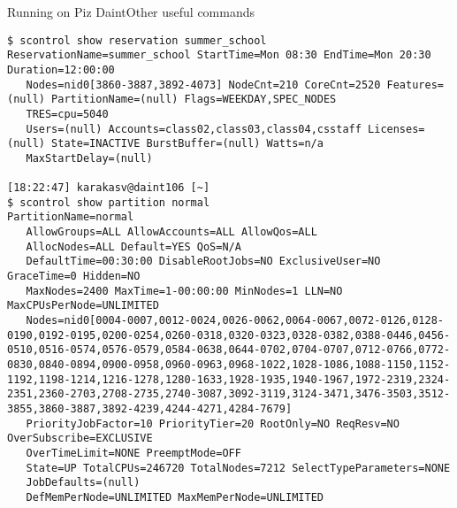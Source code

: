 \begin{frame}[fragile]{Running on Piz Daint}{Other useful commands}
  \begin{lstlisting}[style=console]
$ scontrol show reservation summer_school
ReservationName=summer_school StartTime=Mon 08:30 EndTime=Mon 20:30 Duration=12:00:00
   Nodes=nid0[3860-3887,3892-4073] NodeCnt=210 CoreCnt=2520 Features=(null) PartitionName=(null) Flags=WEEKDAY,SPEC_NODES
   TRES=cpu=5040
   Users=(null) Accounts=class02,class03,class04,csstaff Licenses=(null) State=INACTIVE BurstBuffer=(null) Watts=n/a
   MaxStartDelay=(null)

[18:22:47] karakasv@daint106 [~]
$ scontrol show partition normal
PartitionName=normal
   AllowGroups=ALL AllowAccounts=ALL AllowQos=ALL
   AllocNodes=ALL Default=YES QoS=N/A
   DefaultTime=00:30:00 DisableRootJobs=NO ExclusiveUser=NO GraceTime=0 Hidden=NO
   MaxNodes=2400 MaxTime=1-00:00:00 MinNodes=1 LLN=NO MaxCPUsPerNode=UNLIMITED
   Nodes=nid0[0004-0007,0012-0024,0026-0062,0064-0067,0072-0126,0128-0190,0192-0195,0200-0254,0260-0318,0320-0323,0328-0382,0388-0446,0456-0510,0516-0574,0576-0579,0584-0638,0644-0702,0704-0707,0712-0766,0772-0830,0840-0894,0900-0958,0960-0963,0968-1022,1028-1086,1088-1150,1152-1192,1198-1214,1216-1278,1280-1633,1928-1935,1940-1967,1972-2319,2324-2351,2360-2703,2708-2735,2740-3087,3092-3119,3124-3471,3476-3503,3512-3855,3860-3887,3892-4239,4244-4271,4284-7679]
   PriorityJobFactor=10 PriorityTier=20 RootOnly=NO ReqResv=NO OverSubscribe=EXCLUSIVE
   OverTimeLimit=NONE PreemptMode=OFF
   State=UP TotalCPUs=246720 TotalNodes=7212 SelectTypeParameters=NONE
   JobDefaults=(null)
   DefMemPerNode=UNLIMITED MaxMemPerNode=UNLIMITED
  \end{lstlisting}
\end{frame}
